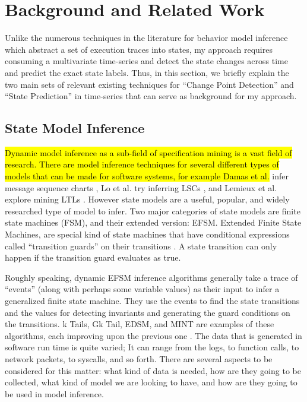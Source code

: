 \chapter{Background and Related Work} \label{sec:background}
Unlike the numerous techniques in the literature for behavior model inference \cite{lang1998results, walkinshaw2016inferring, Lo2007Mining, dallmeier2006mining} which abstract a set of execution traces into states, my approach requires consuming a multivariate time-series and detect the state changes across time and predict the exact state labels. Thus, in this section, we briefly explain the two main sets of relevant existing techniques for ``Change Point Detection'' and ``State Prediction'' in time-series that can serve as background for my approach.  

\section{State Model Inference}
\hl{Dynamic model inference as a sub-field of specification mining is a vast field of research.
There are model inference techniques for several different types of models that can be made for software systems, for example Damas et al. } infer message sequence charts \cite{damas2005generating}, Lo et al. try inferring LSCs \cite{Lo2007Mining}, and Lemieux et al. explore mining LTLs \cite{lemieux2015general}. However state models are a useful, popular, and widely researched type of model to infer. Two major categories of state models are finite state machines (FSM), and their extended version: EFSM. Extended Finite State Machines, are special kind of state machines that have conditional expressions called ``transition guards'' on their transitions \cite{lorenzoli2008automatic}. A state transition can only happen if the transition guard evaluates as true.

Roughly speaking, dynamic EFSM inference algorithms generally take a trace of ``events'' (along with perhaps some variable values) as their input \cite{walkinshaw2016inferring} to infer a generalized finite state machine. They use the events to find the state transitions and the values for detecting invariants and generating the guard conditions on the transitions. 
k Tails, Gk Tail, EDSM, and MINT are examples of these algorithms, each improving upon the previous one \cite{biermann1972synthesis, lorenzoli2008automatic, lang1998results, walkinshaw2016inferring}.  %
The data that is generated in software run time is quite varied; It can range from the logs, to function calls, to network packets, to syscalls, and so forth. There are several aspects to be considered for this matter: what kind of data is needed, how are they going to be collected, what kind of model we are looking to have, and how are they going to be used in model inference. 

